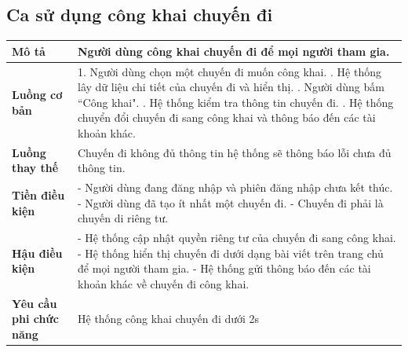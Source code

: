 \subsection{Ca sử dụng công khai chuyến đi}
\vspace{0.5cm}


\noindent 
\begin{tabularx}{\linewidth}{| l | X |} 
\hline 
\textbf{Mô tả} & Người dùng công khai chuyến đi để mọi người tham gia. \\
\hline 
\textbf{Luồng cơ bản} & 1. Người dùng chọn một chuyến đi muốn công khai. \newline
                        2. Hệ thống lây dữ liệu chi tiết của chuyến đi và hiển thị. \newline
                        3. Người dùng bấm ``Công khai". \newline
                        4. Hệ thống kiểm tra thông tin chuyến đi. \newline
                        5. Hệ thống chuyển đổi chuyến đi sang công khai và thông báo đến các tài khoản khác. \\
             
               
\hline 
\textbf{Luồng thay thế} & Chuyến đi không đủ thông tin hệ thống sẽ thông báo lỗi chưa đủ thông tin. \\
       
\hline 
\textbf{Tiền điều kiện} & - Người dùng đang đăng nhập và phiên đăng nhập chưa kết thúc.\newline
                        - Người dùng đã tạo ít nhất một chuyến đi. \newline
                        - Chuyến đi phải là chuyến di riêng tư.\\


\hline 
\textbf{Hậu điều kiện} & - Hệ thống cập nhật quyền riêng tư của chuyến đi sang công khai. \newline
- Hệ thống hiển thị chuyến đi dưới dạng bài viết trên trang chủ để mọi người tham gia. \newline
- Hệ thống gửi thông báo đến các tài khoản khác về chuyến đi công khai. \\
                        

\hline 
\textbf{Yêu cầu phi chức năng} & Hệ thống công khai chuyến đi dưới 2s \\
\hline 
\end{tabularx}

